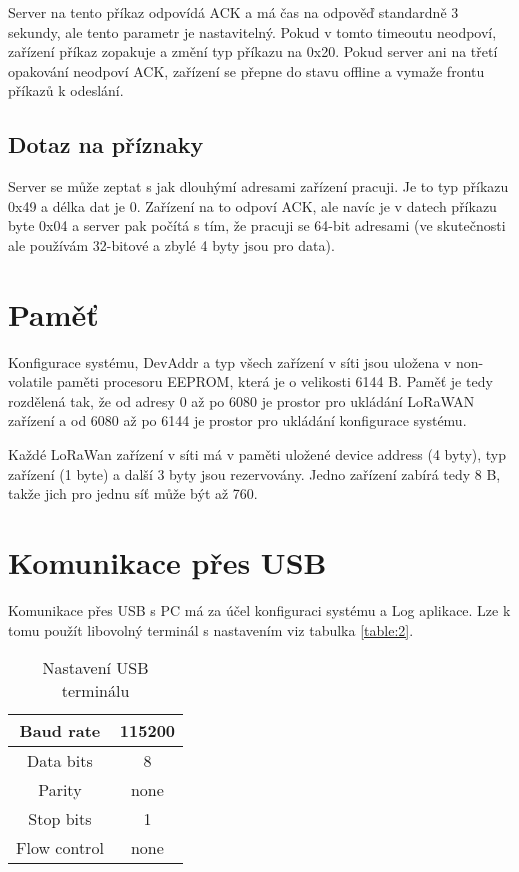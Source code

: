 Server na tento příkaz odpovídá ACK a má čas na odpověď standardně 3 sekundy, ale tento parametr je nastavitelný. Pokud v tomto timeoutu neodpoví, zařízení  příkaz zopakuje a změní typ příkazu na 0x20. Pokud server ani na třetí opakování neodpoví ACK, zařízení se přepne do stavu offline a vymaže frontu příkazů k odeslání.


\subsection{Dotaz na příznaky}
Server se může zeptat s jak dlouhýmí adresami zařízení pracuji. Je to typ příkazu 0x49 a délka dat je 0. Zařízení na to odpoví ACK, ale navíc je v datech příkazu byte 0x04 a server pak počítá s tím, že pracuji se 64-bit adresami (ve skutečnosti ale používám 32-bitové a zbylé 4 byty jsou pro data).


\section{Paměť}
Konfigurace systému, DevAddr a typ všech zařízení v síti jsou uložena v non-volatile paměti procesoru EEPROM, která je o velikosti 6144 B. 
Paměť je tedy rozdělená tak, že od adresy 0 až po 6080 je prostor pro ukládání LoRaWAN zařízení a od 6080 až po 6144 je prostor pro ukládání konfigurace systému.

Každé LoRaWan zařízení v síti má v paměti uložené device address (4 byty), typ zařízení (1 byte) a další 3 byty jsou rezervovány. 
Jedno zařízení zabírá tedy 8 B, takže jich pro jednu síť může být až 760.


\section{Komunikace přes USB}
Komunikace přes USB s PC má za účel konfiguraci systému a Log aplikace. Lze k tomu použít libovolný terminál s nastavením viz tabulka \ref{table:2}.

\begin{table}[!h]
    \centering
    \begin{tabular}{ |c|c| }
     \hline

     Baud rate              & 115200           \\ \hline
     Data bits              & 8                 \\ \hline
     Parity                 & none              \\ \hline
     Stop bits              & 1                 \\ \hline
     Flow control           & none               \\ \hline

    \end{tabular}
    \caption{Nastavení USB terminálu}
    \label{table:3}
\end{table}


